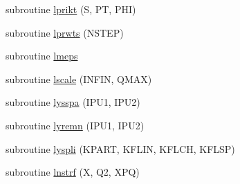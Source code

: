 \begin{DoxyCompactItemize}
subroutine \hyperlink{djangoh__l_8f_a86a7e05b81775926e5e11abdd235e202}{lprikt} (S, P\+T, P\+H\+I)
\item 
subroutine \hyperlink{djangoh__l_8f_a66eacd9bc5836bc43c41276ae41a6a59}{lprwts} (N\+S\+T\+E\+P)
\item 
subroutine \hyperlink{djangoh__l_8f_aa9cff44f133170139f6af5e0b9b955fe}{lmeps}
\item 
subroutine \hyperlink{djangoh__l_8f_a831b9ccf6317253a30b5f7f08c76ef03}{lscale} (I\+N\+F\+I\+N, Q\+M\+A\+X)
\item 
subroutine \hyperlink{djangoh__l_8f_ad96114ee498da69ba22dcdb67af32668}{lysspa} (I\+P\+U1, I\+P\+U2)
\item 
subroutine \hyperlink{djangoh__l_8f_a0aab017503862c0f617dc07da9bd8afe}{lyremn} (I\+P\+U1, I\+P\+U2)
\item 
subroutine \hyperlink{djangoh__l_8f_aa33ce25ab97aa9770a5e2e5f3980fd2e}{lyspli} (K\+P\+A\+R\+T, K\+F\+L\+I\+N, K\+F\+L\+C\+H, K\+F\+L\+S\+P)
\item 
subroutine \hyperlink{djangoh__l_8f_aaf60c1c6a99e30d85f81058b6c04912e}{lnstrf} (X, Q2, X\+P\+Q)
\end{DoxyCompactItemize}


